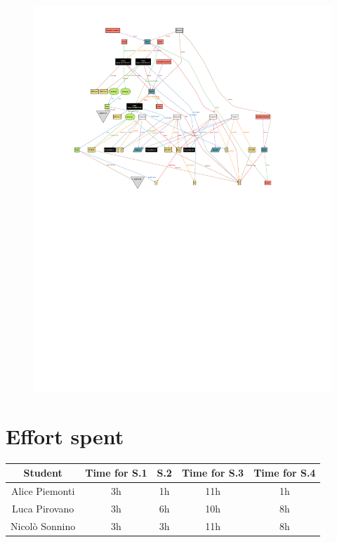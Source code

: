 \documentclass[table, 12pt]{article}
\begin{document}
\begin{landscape}
\begin{figure}[H]
        \includegraphics[scale=1.5]{assets/Alloy-Analyzer/world3.pdf}
    \end{figure}
\end{landscape}
\pagestyle{plain}
\section{Effort spent}
\begin{tabular}{ | c || c | c | c | c|}
    \hline
    Student        & Time for S.1 & S.2 & Time for S.3 & Time for S.4 \\ \hline
    Alice Piemonti & 3h           & 1h  & 11h          & 1h           \\ \hline
    Luca Pirovano  & 3h           & 6h  & 10h          & 8h           \\ \hline
    Nicolò Sonnino & 3h           & 3h  & 11h          & 8h           \\
    \hline
\end{tabular}
\end{document}
